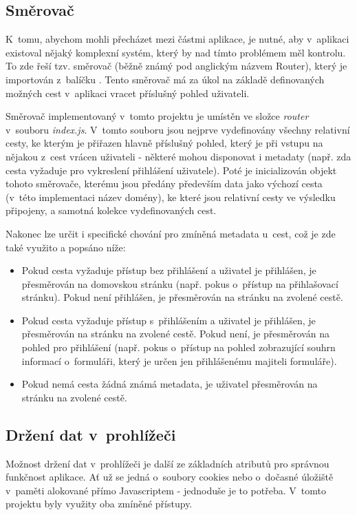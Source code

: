 	\subsection{Směrovač}\label{sec:fe_router} %
	K~tomu, abychom mohli přecházet mezi částmi aplikace, je nutné, aby v~aplikaci existoval nějaký komplexní systém, který by nad tímto problémem měl kontrolu. To zde řeší tzv. směrovač (běžně známý pod anglickým názvem Router), který je importován z~balíčku . Tento směrovač má za úkol na základě definovaných možných cest v~aplikaci vracet příslušný pohled uživateli.
	
	Směrovač implementovaný v~tomto projektu je umístěn ve složce \textit{router} v~souboru \textit{index.js}. V~tomto souboru jsou nejprve vydefinovány všechny relativní cesty, ke kterým je přiřazen hlavně příslušný pohled, který je při vstupu na nějakou z~cest vrácen uživateli - některé mohou disponovat i metadaty (např. zda cesta vyžaduje pro vykreslení přihlášení uživatele). Poté je inicializován objekt tohoto směrovače, kterému jsou předány především data jako výchozí cesta (v~této implementaci název domény), ke které jsou relativní cesty ve výsledku připojeny, a samotná kolekce vydefinovaných cest. 
	
	Nakonec lze určit i specifické chování pro zmíněná metadata u~cest, což je zde také využito a popsáno níže:
	\begin{itemize}
		\item Pokud cesta vyžaduje přístup bez přihlášení a uživatel je přihlášen, je přesměrován na domovskou stránku (např. pokus o~přístup na přihlašovací stránku). Pokud není přihlášen, je přesměrován na stránku na zvolené cestě.
		\item Pokud cesta vyžaduje přístup s~přihlášením a uživatel je přihlášen, je přesměrován na stránku na zvolené cestě. Pokud není, je přesměrován na pohled pro přihlášení (např. pokus o~přístup na pohled zobrazující souhrn informací o~formuláři, který je určen jen přihlášenému majiteli formuláře).
		\item Pokud nemá cesta žádná známá metadata, je uživatel přesměrován na stránku na zvolené cestě.
	\end{itemize}

	\subsection{Držení dat v~prohlížeči} %
	Možnost držení dat v~prohlížeči je další ze základních atributů pro správnou funkčnost aplikace. Ať už se jedná o~soubory cookies nebo o~dočasné úložiště v~paměti alokované přímo Javascriptem - jednoduše je to potřeba. V~tomto projektu byly využity oba zmíněné přístupy.
	
